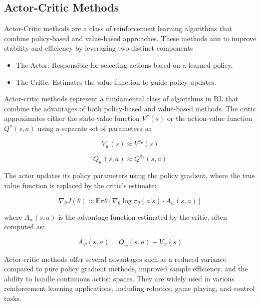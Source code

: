 \subsection{Actor-Critic Methods}
Actor-Critic methods are a class of reinforcement learning algorithms that combine policy-based and value-based approaches. These methods aim to improve stability and efficiency by leveraging two distinct components

\begin{itemize}
    \item The Actor: Responsible for selecting actions based on a learned policy.
    \item The Critic: Estimates the value function to guide policy updates.
\end{itemize}

Actor-critic methods represent a fundamental class of algorithms in RL that combine the advantages of both policy-based and value-based methods. The critic approximates either the state-value function $V^\pi(s)$ or the action-value function $Q^\pi(s,a)$ using a separate set of parameters $w$:

\begin{equation*}
    V_w(s) \approx V^{\pi_\theta}(s)
\end{equation*}

\begin{equation*}
    Q_w(s,a) \approx Q^{\pi_\theta}(s,a)
\end{equation*}

The actor updates its policy parameters using the policy gradient, where the true value function is replaced by the critic's estimate:

\begin{equation*}
\nabla_\theta J(\theta) \approx \mathbb{E}{\pi\theta}\left[\nabla_\theta \log \pi_\theta(a|s) \cdot A_w(s,a)\right]
\end{equation*}

where $A_w(s,a)$ is the advantage function estimated by the critic, often computed as:

\begin{equation*}
A_w(s,a) = Q_w(s,a) - V_w(s)
\end{equation*}

Actor-critic methods offer several advantages such as a reduced variance compared to pure policy gradient methods, improved sample efficiency, and the ability to handle continuous action spaces. They are widely used in various reinforcement learning applications, including robotics, game playing, and control tasks.

